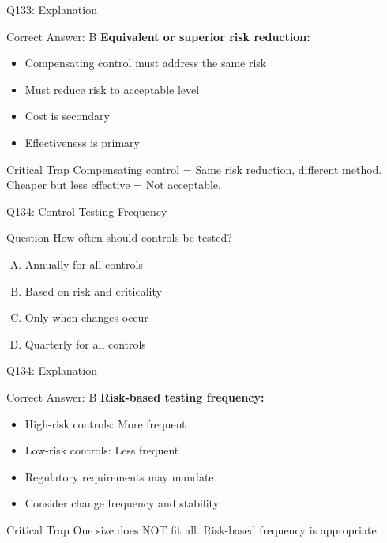 \documentclass{beamer}
\begin{document}
	\begin{frame}{Q133: Explanation}
		\begin{block}{Correct Answer: B}
			\textbf{Equivalent or superior risk reduction:}
			\begin{itemize}
				\item Compensating control must address the same risk
				\item Must reduce risk to acceptable level
				\item Cost is secondary
				\item Effectiveness is primary
			\end{itemize}
		\end{block}
		\begin{alertblock}{Critical Trap}
			Compensating control = Same risk reduction, different method.
			Cheaper but less effective = Not acceptable.
		\end{alertblock}
	\end{frame}
	
	\begin{frame}{Q134: Control Testing Frequency}
		\begin{block}{Question}
			How often should controls be tested?
		\end{block}
		\begin{enumerate}[(A)]
			\item Annually for all controls
			\item Based on risk and criticality
			\item Only when changes occur
			\item Quarterly for all controls
		\end{enumerate}
	\end{frame}
	
	\begin{frame}{Q134: Explanation}
		\begin{block}{Correct Answer: B}
			\textbf{Risk-based testing frequency:}
			\begin{itemize}
				\item High-risk controls: More frequent
				\item Low-risk controls: Less frequent
				\item Regulatory requirements may mandate
				\item Consider change frequency and stability
			\end{itemize}
		\end{block}
		\begin{alertblock}{Critical Trap}
			One size does NOT fit all.
			Risk-based frequency is appropriate.
		\end{alertblock}
	\end{frame}
	
\end{document}
